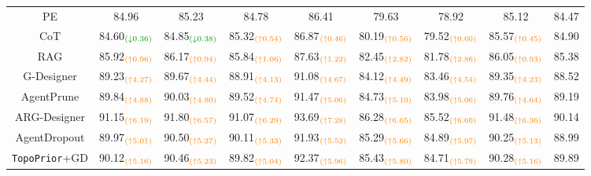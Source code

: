 \documentclass[lettersize,journal]{IEEEtran}
\theoremstyle{plain}
\begin{document}
\begin{table}[!t]
\begin{tabular}{ccccccccc}
PE & 84.96 & 85.23 & 84.78 & 86.41 & 79.63 & 78.92 & 85.12 & 84.47 \\
CoT & 84.60$_{\textcolor{mygreen}{(\downarrow 0.36)}}$ & 84.85$_{\textcolor{mygreen}{(\downarrow 0.38)}}$ & 85.32$_{\textcolor{orange}{(\uparrow 0.54)}}$ & 86.87$_{\textcolor{orange}{(\uparrow 0.46)}}$ & 80.19$_{\textcolor{orange}{(\uparrow 0.56)}}$ & 79.52$_{\textcolor{orange}{(\uparrow 0.60)}}$ & 85.57$_{\textcolor{orange}{(\uparrow 0.45)}}$ & 84.90 \\
RAG & 85.92$_{\textcolor{orange}{(\uparrow 0.96)}}$ & 86.17$_{\textcolor{orange}{(\uparrow 0.94)}}$ & 85.84$_{\textcolor{orange}{(\uparrow 1.06)}}$ & 87.63$_{\textcolor{orange}{(\uparrow 1.22)}}$ & 82.45$_{\textcolor{orange}{(\uparrow 2.82)}}$ & 81.78$_{\textcolor{orange}{(\uparrow 2.86)}}$ & 86.05$_{\textcolor{orange}{(\uparrow 0.93)}}$ & 85.38  \\ \hdashline
G-Designer & 89.23$_{\textcolor{orange}{(\uparrow 4.27)}}$ & 89.67$_{\textcolor{orange}{(\uparrow 4.44)}}$ & 88.91$_{\textcolor{orange}{(\uparrow 4.13)}}$ & 91.08$_{\textcolor{orange}{(\uparrow 4.67)}}$ & 84.12$_{\textcolor{orange}{(\uparrow 4.49)}}$ & 83.46$_{\textcolor{orange}{(\uparrow 4.54)}}$ & 89.35$_{\textcolor{orange}{(\uparrow 4.23)}}$ & 88.52  \\
AgentPrune & 89.84$_{\textcolor{orange}{(\uparrow 4.88)}}$ & 90.03$_{\textcolor{orange}{(\uparrow 4.80)}}$ & 89.52$_{\textcolor{orange}{(\uparrow 4.74)}}$ & 91.47$_{\textcolor{orange}{(\uparrow 5.06)}}$ & 84.73$_{\textcolor{orange}{(\uparrow 5.10)}}$ & 83.98$_{\textcolor{orange}{(\uparrow 5.06)}}$ & 89.76$_{\textcolor{orange}{(\uparrow 4.64)}}$ & 89.19 \\
ARG-Designer & 91.15$_{\textcolor{orange}{(\uparrow 6.19)}}$ & 91.80$_{\textcolor{orange}{(\uparrow 6.57)}}$ & 91.07$_{\textcolor{orange}{(\uparrow 6.29)}}$ & 93.69$_{\textcolor{orange}{(\uparrow 7.28)}}$ & 86.28$_{\textcolor{orange}{(\uparrow 6.65)}}$ & 85.52$_{\textcolor{orange}{(\uparrow 6.60)}}$ & 91.48$_{\textcolor{orange}{(\uparrow 6.36)}}$ & 90.14 \\
AgentDropout & 89.97$_{\textcolor{orange}{(\uparrow 5.01)}}$ & 90.50$_{\textcolor{orange}{(\uparrow 5.27)}}$ & 90.11$_{\textcolor{orange}{(\uparrow 5.33)}}$ & 91.93$_{\textcolor{orange}{(\uparrow 5.52)}}$ & 85.29$_{\textcolor{orange}{(\uparrow 5.66)}}$ & 84.89$_{\textcolor{orange}{(\uparrow 5.97)}}$ & 90.25$_{\textcolor{orange}{(\uparrow 5.13)}}$ & 88.99 \\ \hdashline
\rowcolor{mylightgray} {\texttt{TopoPrior}+GD} & 90.12$_{\textcolor{orange}{(\uparrow 5.16)}}$ & 90.46$_{\textcolor{orange}{(\uparrow 5.23)}}$ & 89.82$_{\textcolor{orange}{(\uparrow 5.04)}}$ & 92.37$_{\textcolor{orange}{(\uparrow 5.96)}}$ & 85.43$_{\textcolor{orange}{(\uparrow 5.80)}}$ & 84.71$_{\textcolor{orange}{(\uparrow 5.79)}}$ & 90.28$_{\textcolor{orange}{(\uparrow 5.16)}}$ & 89.89  \\

\end{tabular}
\end{table}
\end{document}
